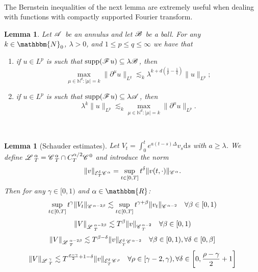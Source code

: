 \documentclass[11pt,reqno]{amsart}
\newcommand{\cdummy}{\cdot}
\newcommand{\mathd}{\mathrm{d}}
\newcommand{\tmop}[1]{\ensuremath{\operatorname{#1}}}
\newenvironment{enumeratenumeric}{\begin{enumerate}[1.] }{\end{enumerate}}
\newtheorem{lemma}[theorem]{Lemma}
\newcommand{\CC}{\mathscr{C} \hspace{.1em}}
\newcommand{\CF}{\mathscr{F} \hspace{.1em}}
\newcommand{\CB}{\mathscr{B} \hspace{.1em}}
\newcommand{\CA}{\mathscr{A} \hspace{.1em}}
\newcommand{\LL}{\mathscr{L} \hspace{.2em}}
\begin{document}
\

The Bernstein inequalities of the next lemma are extremely useful when
dealing with functions with compactly supported Fourier transform.

\begin{lemma}
  \label{lemma:Bernstein}Let $\CA$ be an annulus and let $\CB$ be a ball. For
  any $k \in \mathbbm{N}_0$, $\lambda > 0$, and $1 \leqslant p \leqslant q
  \leqslant \infty$ we have that
  \begin{enumeratenumeric}
    \item if $u \in L^p$ is such that $\tmop{supp} (\CF u) \subseteq \lambda
    \CB$, then
    \[ \max_{\mu \in \mathbb{N}^d : | \mu | = k} \| \partial^{\mu} u\|_{L^q}
       \lesssim_k \lambda^{k + d \left( \frac{1}{p} - \frac{1}{q} \right)}
       \|u\|_{L^p} ; \]
    \item if $u \in L^p$ is such that $\tmop{supp} (\CF u) \subseteq \lambda
    \CA$, then
    \[ \lambda^k \|u\|_{L^p} \lesssim_k \max_{\mu \in \mathbb{N}^d : | \mu | =
       k} \| \partial^{\mu} u\|_{L^p} . \]
  \end{enumeratenumeric}
\end{lemma}

\

\begin{lemma}[Schauder estimates]
  \label{l:schauder}Let $V_t = \int_0^t e^{a (t - s) \Delta} v_s \mathd s$
  with $a \geqslant \lambda$. We define $\LL^{\alpha}_T = \CC^{\alpha}_T \cap
  C_T^{\alpha / 2} \CC^0$ and introduce the norm
  \[ \| v \|_{\mathcal{E}^{\delta}_T \CC^{\alpha}} = \sup_{t \in [0, T]}
     t^{\delta} \| v (t, \cdummy) \|_{\CC^{\alpha}} . \]
  Then for any $\gamma \in [0, 1)$ and $\alpha \in \mathbbm{R}$:
  \[ \sup_{t \in [0, T]} t^{\gamma} \| V_t \|_{\CC^{\alpha - 2 \beta}}
     \lesssim \sup_{t \in [0, T]} t^{\gamma + \beta} \| v_t \|_{\CC^{\alpha -
     2}} \quad \forall \beta \in [0, 1) \]
  \[ \| V \|_{\LL^{\alpha - 2 \beta}_T} \lesssim T^{\beta} \| v
     \|_{\CC^{\alpha - 2}_T} \quad \forall \beta \in [0, 1) \]
  \[ \| V \|_{\LL_T^{\alpha - 2 \beta}} \lesssim T^{\beta - \delta} \| v
     \|_{\mathcal{E}^{\delta}_{_T} \CC^{\alpha - 2}} \quad \forall \beta \in
     [0, 1), \forall \delta \in [0, \beta] \]
  \[ \| V \|_{\LL_T^{\gamma}} \lesssim T^{\frac{\rho - \gamma}{2} + 1 -
     \delta} \| v \|_{\mathcal{E}^{\delta}_{_T} \CC^{\rho}} \quad \forall \rho
     \in [\gamma - 2, \gamma), \forall \delta \in \left[ 0, \frac{\rho -
     \gamma}{2} + 1 \right] \]
\end{lemma}
\end{document}
